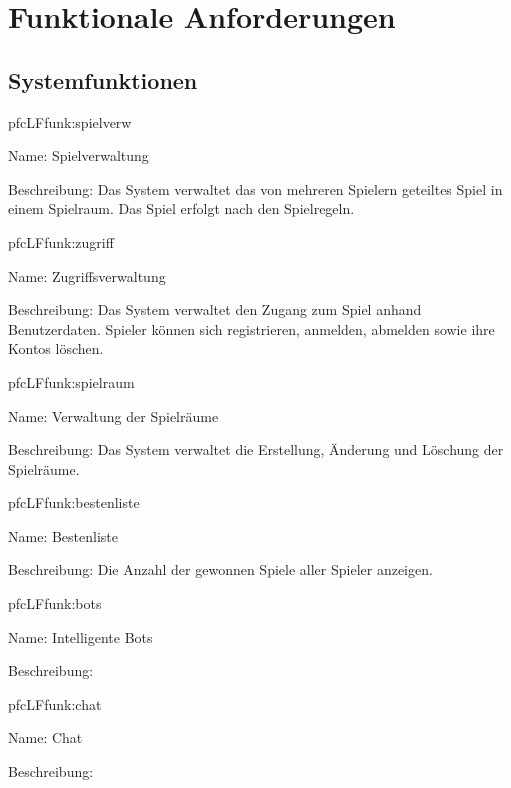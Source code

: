 \chapter{Funktionale Anforderungen}


\section{Systemfunktionen}

\setcounter{pfc}{10}

\begin{description}[leftmargin=5em, style=sameline]

	\begin{lhp}{pfc}{LF}{funk:spielverw}
		\item [Name:] Spielverwaltung
		\item [Beschreibung:] Das System verwaltet das von mehreren Spielern geteiltes Spiel in einem Spielraum. Das Spiel erfolgt nach den Spielregeln.
	\end{lhp}
	
	\begin{lhp}{pfc}{LF}{funk:zugriff}
		\item [Name:] Zugriffsverwaltung
		\item [Beschreibung:] Das System verwaltet den Zugang zum Spiel anhand Benutzerdaten. Spieler können sich registrieren, anmelden, abmelden sowie ihre Kontos löschen.
	\end{lhp}

	\begin{lhp}{pfc}{LF}{funk:spielraum}
		\item [Name:] Verwaltung der Spielräume
		\item [Beschreibung:] Das System verwaltet die Erstellung, Änderung und Löschung der Spielräume.
	\end{lhp}
	
	\begin{lhp}{pfc}{LF}{funk:bestenliste}
		\item [Name:] Bestenliste
		\item [Beschreibung:] Die Anzahl der gewonnen Spiele aller Spieler anzeigen.
	\end{lhp}
	
	\begin{lhp}{pfc}{LF}{funk:bots}
		\item [Name:] Intelligente Bots
		\item [Beschreibung:] 
	\end{lhp}
	
	\begin{lhp}{pfc}{LF}{funk:chat}
		\item [Name:] Chat
		\item [Beschreibung:]
	\end{lhp}

\end{description}


